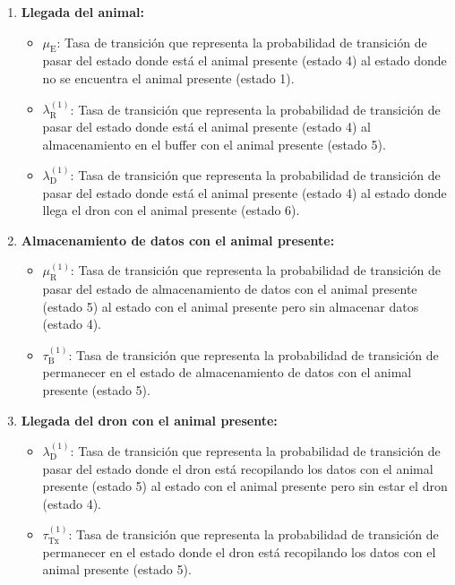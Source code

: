 \begin{enumerate}[label=\arabic*.]
    \item \textbf{Llegada del animal:}
    \begin{itemize}
        \item $\mu_{\text{E}}$: Tasa de transición que representa la probabilidad de transición de pasar del estado donde está el animal presente (estado 4) al estado donde no se encuentra el animal presente (estado 1).
        \item $\lambda_{\text{R}}^{(1)}$: Tasa de transición que representa la probabilidad de transición de pasar del estado donde está el animal presente (estado 4) al almacenamiento en el buffer con el animal presente (estado 5).
        \item $\lambda_{\text{D}}^{(1)}$: Tasa de transición que representa la probabilidad de transición de pasar del estado donde está el animal presente (estado 4) al estado donde llega el dron con el animal presente (estado 6).
    \end{itemize}
    
    \item \textbf{Almacenamiento de datos con el animal presente:}
    \begin{itemize}
        \item $\mu_{\text{R}}^{(1)}$: Tasa de transición que representa la probabilidad de transición de pasar del estado de almacenamiento de datos con el animal presente (estado 5) al estado con el animal presente pero sin almacenar datos (estado 4).
        \item $\tau_{\text{B}}^{(1)}$: Tasa de transición que representa la probabilidad de transición de permanecer en el estado de almacenamiento de datos con el animal presente (estado 5).
    \end{itemize}
    
    \item \textbf{Llegada del dron con el animal presente:}
    \begin{itemize}
        \item $\lambda_{\text{D}}^{(1)}$: Tasa de transición que representa la probabilidad de transición de pasar del estado donde el dron está recopilando los datos con el animal presente (estado 5) al estado con el animal presente pero sin estar el dron (estado 4).
        \item $\tau_{\text{Tx}}^{(1)}$: Tasa de transición que representa la probabilidad de transición de permanecer en el estado donde el dron está recopilando los datos con el animal presente (estado 5).
    \end{itemize}
    

\end{enumerate}
